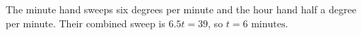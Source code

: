 The minute hand sweeps six degrees per minute and the hour hand half a degree per minute. Their combined sweep is $6.5t=39$, so $\boxed{t=6\text{ minutes}}$.
